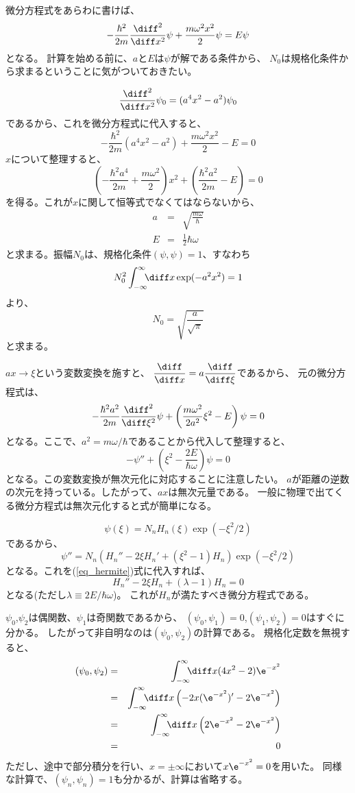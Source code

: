 微分方程式をあらわに書けば、
$$
  -\frac{\hbar^2}{2m} \frac{\diff^2}{\diff x^2} \psi  + \frac{m \omega^2 x^2}{2} \psi = E \psi
$$
となる。
計算を始める前に、$a$と$E$は$\psi$が解である条件から、
$N_0$は規格化条件から求まるということに気がついておきたい。

$$
  \frac{\diff^2}{\diff x^2} \psi_0 = (a^4x^2-a^2) \psi_0
$$
であるから、これを微分方程式に代入すると、
$$
  -\frac{\hbar^2}{2m} (a^4 x^2 -a^2)  + \frac{m \omega^2 x^2}{2} - E = 0
$$
$x$について整理すると、
$$
  \left( -\frac{\hbar^2 a^4}{2m}  + \frac{m \omega^2 }{2} \right)x^2 +
  \left( \frac{\hbar^2a^2}{2m} -E \right) = 0
$$
を得る。これが$x$に関して恒等式でなくてはならないから、
\begin{eqnarray*}
  a &=& \sqrt{\frac{m\omega}{\hbar}} \\
  E &=& \frac{1}{2} \hbar \omega
\end{eqnarray*}
と求まる。振幅$N_0$は、規格化条件$(\psi,\psi)=1$、すなわち
$$
  N_0^2 \int_{-\infty}^{\infty} \!\!\! \diff x  \exp(-a^2 x^2) = 1
$$
より、
$$
  N_0 = \sqrt{\frac{a}{\sqrt{\pi}}}
$$
と求まる。

$ax \rightarrow \xi$という変数変換を施すと、
$\displaystyle \frac{\diff}{\diff x} = a \displaystyle\frac{\diff}{\diff \xi}$であるから、
元の微分方程式は、
$$
  -\frac{\hbar^2 a^2}{2m} \frac{\diff^2}{\diff \xi^2} \psi +
  \left(
  \frac{m \omega^2}{2a^2} \xi^2 -E
  \right) \psi = 0
$$
となる。ここで、$a^2 = m\omega/\hbar$であることから代入して整理すると、
\begin{equation}
  - \psi'' + (\xi^2 - \frac{2E}{\hbar \omega})\psi = 0 \label{eq_hermite}
\end{equation}
となる。この変数変換が無次元化に対応することに注意したい。
$a$が距離の逆数の次元を持っている。したがって、$ax$は無次元量である。
一般に物理で出てくる微分方程式は無次元化すると式が簡単になる。

$$
  \psi(\xi) = N_n H_n(\xi) \exp(-\xi^2/2)
$$
であるから、
$$
  \psi'' = N_n( H_n'' - 2\xi H_n' + (\xi^2-1) H_n) \exp(-\xi^2/2)
$$
となる。これを(\ref{eq_hermite})式に代入すれば、
$$
  H_n'' - 2 \xi H_n +(\lambda -1)H_n = 0
$$
となる(ただし$\lambda \equiv 2E/\hbar \omega$)。
これが$H_n$が満たすべき微分方程式である。

$\psi_0$,$\psi_2$は偶関数、$\psi_1$は奇関数であるから、
$(\psi_0,\psi_1)=0$,$(\psi_1,\psi_2)=0$はすぐに分かる。
したがって非自明なのは$(\psi_0,\psi_2)$の計算である。
規格化定数を無視すると、
\begin{eqnarray*}
  (\psi_0,\psi_2) &=& \int_{-\infty}^{\infty}\!\!\! \diff x (4x^2-2) \e^{-x^2} \\
  &=& \int_{-\infty}^{\infty}\!\!\! \diff x  \left(
  -2x (\e^{-x^2})' - 2 \e^{-x^2} \right) \\
  &=& \int_{-\infty}^{\infty}\!\!\! \diff x  \left( 2\e^{-x^2} - 2 \e^{-x^2} \right)\\
  &=& 0
\end{eqnarray*}
ただし、途中で部分積分を行い、$x=\pm \infty$において$x \e^{-x^2} = 0$を用いた。
同様な計算で、$(\psi_n,\psi_n) = 1$も分かるが、計算は省略する。

